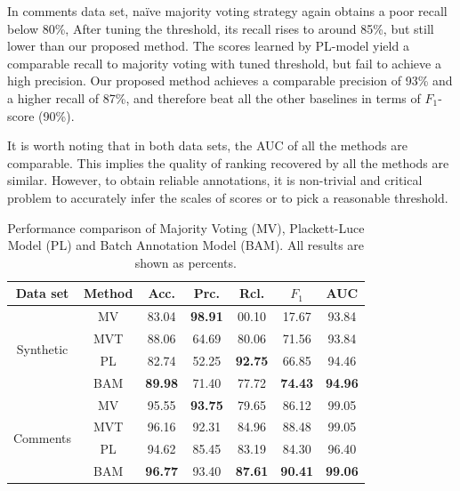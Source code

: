 In comments data set, na\"{i}ve majority voting strategy again obtains a poor recall below 80\%, 
After tuning the threshold, its recall rises to around 85\%, but still lower than our proposed method.  
The scores learned by PL-model yield a comparable recall to majority voting with tuned threshold, 
but fail to achieve a high precision.  
Our proposed method achieves a comparable precision of 93\% and a higher recall of 87\%, 
and therefore beat all the other baselines in terms of $F_1$-score (90\%).  


It is worth noting that in both data sets, the AUC of all the methods are comparable.  
This implies the quality of ranking recovered by all the methods are similar.  
However, to obtain reliable annotations, it is non-trivial and critical problem to accurately infer the scales of scores 
or to pick a reasonable threshold.  



\begin{table}[!t]
\centering
 {\caption{Performance comparison of Majority Voting (MV), Plackett-Luce Model (PL) and Batch Annotation Model (BAM).  
 All results are shown as percents.}\label{tab:performance}}
{

  \begin{tabular}{@{}c@{}|@{}c@{}||c|c|c|c|c@{}}
    \hline
        Data set & Method    & Acc.           & Prc.           & Rcl.           & $F_1$          & AUC \\ \hline \hline
        \multirow{4}{*}{Synthetic}
                 & MV        & 83.04          & \textbf{98.91} & 00.10          & 17.67          & 93.84          \\ \cline{2-7}
                 & MVT       & 88.06          & 64.69          & 80.06          & 71.56          & 93.84          \\ \cline{2-7}
                 & PL        & 82.74          & 52.25          & \textbf{92.75} & 66.85          & 94.46          \\ \cline{2-7}
                 & BAM       & \textbf{89.98} & 71.40          & 77.72          & \textbf{74.43} & \textbf{94.96} \\ \hline
        \multirow{4}{*}{Comments}
                 & MV        & 95.55          & \textbf{93.75} & 79.65          & 86.12          & 99.05          \\ \cline{2-7}
                 & MVT       & 96.16          & 92.31          & 84.96          & 88.48          & 99.05          \\ \cline{2-7}
                 & PL        & 94.62          & 85.45          & 83.19          & 84.30          & 96.40          \\ \cline{2-7}
                 & BAM       & \textbf{96.77} & 93.40          & \textbf{87.61} & \textbf{90.41} & \textbf{99.06} \\ \hline
  \end{tabular}
}
\end{table}
